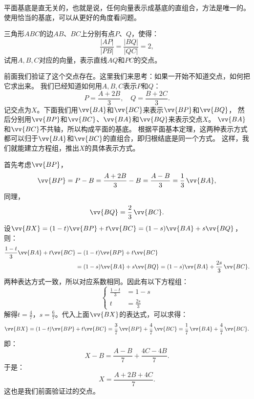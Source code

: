 \documentclass[12pt,UTF8]{ctexbook}
\begin{document}
平面基底是直无关的，也就是说，任何向量表示成基底的直组合，方法是唯一的。
使用恰当的基底，可以从更好的角度看问题。

\begin{et}\label{et:0-0-20}
    三角形$ABC$的边$AB$、$BC$上分别有点$P$、$Q$，使得：
    $$ \frac{|AP|}{|PB|} = \frac{|BQ|}{|QC|} = 2,$$
    试用$A,B,C$对应的向量，表示直线$AQ$和$PC$的交点。
\end{et}
\begin{so}
    前面我们验证了这个交点存在。这里我们来思考：如果一开始不知道交点，如何把它求出来。
    我们已经知道如何用$A,B,C$表示$P$和$Q$：
    $$ P = \frac{A + 2B}{3}, \quad Q = \frac{B + 2C}{3}. $$
    记交点为$X$。下面我们用$\vv{BA}$和$\vv{BC}$来表示$\vv{BP}$和$\vv{BQ}$，
    然后分别用$\vv{BP}$和$\vv{BC}$、$\vv{BA}$和$\vv{BQ}$来表示交点$X$。
    $\vv{BA}$和$\vv{BC}$不共轴，所以构成平面的基底。
    根据平面基本定理，这两种表示方式都可以归于$\vv{BA}$和$\vv{BC}$的直组合，即归根结底是同一个方式。
    这样，我们就能建立方程组，推出$X$的具体表示方式。

    首先考虑$\vv{BP}$，
    $$\vv{BP} = P - B = \frac{A + 2B}{3} - B = \frac{A - B}{3} = \frac13 \, \vv{BA},$$
    同理，
    $$\vv{BQ} = \frac23 \, \vv{BC}.$$
    设$\vv{BX} = (1 - t)\vv{BP} + t\vv{BC} = (1 - s)\vv{BA} + s\vv{BQ}$，则：
    \begin{align*}
        \frac{1 - t}{3}\vv{BA} + t\vv{BC} &= (1 - t)\vv{BP} + t\vv{BC}  \\
        &= (1 - s)\vv{BA} + s\vv{BQ} = (1 - s)\vv{BA} + \frac{2s}{3}\,\vv{BC}.  
    \end{align*}
    两种表达方式一致，所以对应系数相同。因此有以下方程组：
    $$
    \left\{
    \begin{array}{ll}
        \frac{1 - t}{3} &= 1 - s \\
        t &= \frac{2s}{3}
    \end{array}
    \right.
    $$
    解得$t = \frac{4}{7}$，$s = \frac{6}{7}$。代入上面$\vv{BX}$的表达式，可以求得：
    $$\vv{BX} = (1 - t)\vv{BP} + t\vv{BC} = \frac{3}{7} \, \vv{BP} + \frac{4}{7} \, \vv{BC} = \frac17 \, \vv{BA} + \frac{4}{7} \, \vv{BC}. $$
    即：
    $$ X - B = \frac{A - B}{7} + \frac{4C - 4B}{7}.$$
    于是：
    $$ X = \frac{A + 2B + 4C}{7}.$$
    这也是我们前面验证过的交点。    
\end{so}
\end{document}
